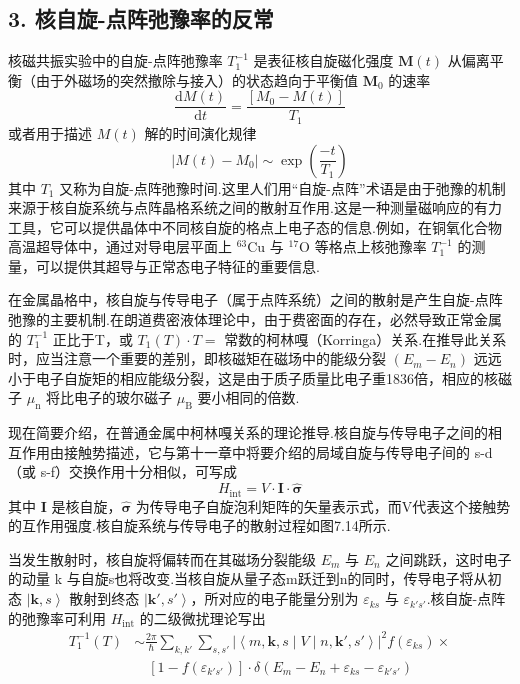 \subsection*{3. 核自旋-点阵弛豫率的反常}

核磁共振实验中的自旋-点阵弛豫率 $T_{1}^{-1}$ 是表征核自旋磁化强度 $\boldsymbol{M}(t)$ 从偏离平衡（由于外磁场的突然撤除与接入）的状态趋向于平衡值 $\boldsymbol{M}_{0}$ 的速率
\begin{equation}
  \frac{\mathrm{d}M(t)}{\mathrm{d}t}=\frac{\left[M_{0}-M(t)\right]}{T_{1}}
\end{equation}
或者用于描述 $M(t)$ 解的时间演化规律
\begin{equation}
  \left|M(t)-M_{0}\right|\sim\exp\left(\frac{-t}{T_{1}}\right)
\end{equation}
其中 $T_{1}$ 又称为自旋-点阵弛豫时间.这里人们用“自旋-点阵”术语是由于弛豫的机制来源于核自旋系统与点阵晶格系统之间的散射互作用.这是一种测量磁响应的有力工具，它可以提供晶体中不同核自旋的格点上电子态的信息.例如，在铜氧化合物高温超导体中，通过对导电层平面上 $^{63}\mathrm{Cu}$ 与 $^{17}\mathrm{O}$ 等格点上核弛豫率 $T_{1}^{-1}$ 的测量，可以提供其超导与正常态电子特征的重要信息.

在金属晶格中，核自旋与传导电子（属于点阵系统）之间的散射是产生自旋-点阵弛豫的主要机制.在朗道费密液体理论中，由于费密面的存在，必然导致正常金属的 $T_{1}^{-1}$ 正比于T，或 $T_{1}(T)\cdot T=$ 常数的柯林嘎（Korringa）关系.在推导此关系时，应当注意一个重要的差别，即核磁矩在磁场中的能级分裂 $\left(E_{m}-E_{n}\right)$ 远远小于电子自旋矩的相应能级分裂，这是由于质子质量比电子重1836倍，相应的核磁子 $\mu_{\mathrm{n}}$ 将比电子的玻尔磁子 $\mu_{\mathrm{B}}$ 要小相同的倍数.

现在简要介绍，在普通金属中柯林嘎关系的理论推导.核自旋与传导电子之间的相互作用由接触势描述，它与第十一章中将要介绍的局域自旋与传导电子间的 s-d（或 s-f）交换作用十分相似，可写成
\begin{equation}
  H_{\mathrm{int}}=V\cdot\boldsymbol{I}\cdot\hat{\boldsymbol{\sigma}}
\end{equation}
其中 $\boldsymbol{I}$ 是核自旋，$\hat{\boldsymbol{\sigma}}$ 为传导电子自旋泡利矩阵的矢量表示式，而V代表这个接触势的互作用强度.核自旋系统与传导电子的散射过程如图7.14所示.

当发生散射时，核自旋将偏转而在其磁场分裂能级 $E_{m}$ 与 $E_{n}$ 之间跳跃，这时电子的动量 k 与自旋s也将改变.当核自旋从量子态m跃迁到n的同时，传导电子将从初态 $\left|\boldsymbol{k},s\right\rangle$ 散射到终态 $\left|\boldsymbol{k}',s'\right\rangle$，所对应的电子能量分别为 $\varepsilon_{ks}$ 与 $\varepsilon_{k's'}$.核自旋-点阵的弛豫率可利用 $H_{\mathrm{int}}$ 的二级微扰理论写出
\begin{equation}
\begin{aligned}
  T_{1}^{-1}(T)&\sim\frac{2\pi}{\hbar}\sum_{k,k'}\sum_{s,s'}
  \left|\left\langle m,\boldsymbol{k},s\mid V\mid n,\boldsymbol{k}',s'\right\rangle\right|^{2}
  f\left(\varepsilon_{ks}\right)\times\\
  &\quad\left[1-f\left(\varepsilon_{k's'}\right)\right]\cdot
  \delta\left(E_{m}-E_{n}+\varepsilon_{ks}-\varepsilon_{k's'}\right)
\end{aligned}
\end{equation}

